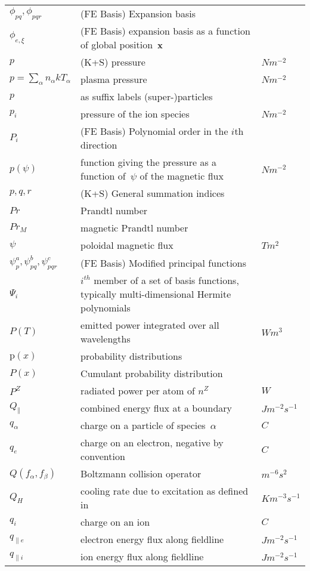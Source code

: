 \begin{longtable}{|p{3.0cm}|p{10.0cm}|p{3.0cm}|}
$\phi_{pq}, \phi_{pqr}$ &  (FE Basis) Expansion basis & \\
$\phi_{e,\xi}$ & (FE Basis) expansion basis as a function of global position~${\bf x}$ & \\
$p$ & (K+S) pressure  & $N m^{-2}$ \\
$p = \sum_\alpha n_\alpha kT_\alpha$ & plasma pressure  & $N m^{-2}$ \\
$p$ & as suffix labels (super-)particles & \\
$p_i$ & pressure of the ion species  & $N m^{-2}$ \\
$P_i$ &  (FE Basis) Polynomial order in the $i$th direction & \\
$p(\psi)$ & function giving the pressure as a function of~$\psi$ of the magnetic flux  & $N m^{-2}$ \\
$p,q,r$ &  (K+S) General summation indices & \\
$Pr$ & Prandtl number & \\
$Pr_M$ & magnetic Prandtl number & \\
$\psi$ & poloidal magnetic flux  & $T m^2$ \\
$\psi^a_p, \psi^b_{pq}, \psi^c_{pqr}$ &  (FE Basis) Modified principal functions & \\
$\Psi_i$ & $i^{th}$ member of a set of basis functions, typically multi-dimensional Hermite polynomials & \\
$P(T)$ & emitted power integrated over all wavelengths  & $W m^3$ \\
$\mathrm{p}(x)$ & probability distributions    & \\
$P(x)$ & Cumulant probability distribution  & \\
$P^Z$ & radiated power per atom of $n^Z$  & $W$ \\
$Q_\|$ & combined energy flux at a boundary  & $J m^{-2} s^{-1}$ \\
$q_\alpha$ & charge on a particle of species~$\alpha$ & $C$ \\
$q_e$ & charge on an electron, negative by convention & $C$ \\
$Q(f_\alpha, f_\beta)$ & Boltzmann collision operator  & $m^{-6} s^2$ \\
$Q_H$ & cooling rate due to excitation as defined in~\cite{Ha13Benc}  & $K m^{-3} s^{-1}$ \\
$q_i$ & charge on an ion  & $C$ \\
$q_{\|e}$ & electron energy flux along fieldline & $J m^{-2} s^{-1}$ \\
$q_{\|i}$ & ion energy flux along fieldline & $J m^{-2} s^{-1}$ \\

\end{longtable}
